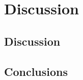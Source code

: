
\chapter{Discussion}
\section{Discussion}

\blindtext

\blindtext
\section{Conclusions}


\newpage


